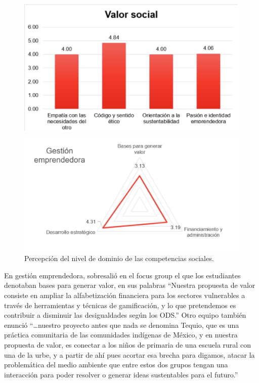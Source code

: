 \documentclass[spanish]{textolivre}
\begin{document}
\begin{figure}[htbp]
\begin{minipage}[t]{0.47\textwidth}
\subcaption{}
\end{minipage}
\hfill
\begin{minipage}[t]{0.47\textwidth}
\includegraphics[width=\linewidth]{fig5-4.png}
\subcaption{}
\end{minipage}
\hfill
\begin{minipage}[t]{0.65\textwidth}
\includegraphics[width=\linewidth]{fig5-5.png}
\subcaption{}
\end{minipage}
\caption{Percepción del nivel de dominio de las competencias sociales.}
\label{fig5}
\end{figure}

En gestión emprendedora, sobresalió en el focus group el que los estudiantes denotaban bases para generar valor, en sus palabras “Nuestra propuesta de valor consiste en ampliar la alfabetización financiera para los sectores vulnerables a través de herramientas y técnicas de gamificación, y lo que pretendemos es contribuir a disminuir las desigualdades según los ODS.” Otro equipo también enunció “…nuestro proyecto antes que nada se denomina Tequio, que es una práctica comunitaria de las comunidades indígenas de México, y en nuestra propuesta de valor, es conectar a los niños de primaria de una escuela rural con una de la urbe, y a partir de ahí pues acortar esa brecha para digamos, atacar la problemática del medio ambiente que entre estos dos grupos tengan una interacción para poder resolver o generar ideas sustentables para el futuro.” 
\end{document}

